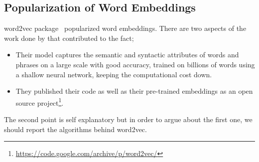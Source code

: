 

\subsection{Popularization of Word Embeddings}%
\label{sub:popularization_of_word_embeddings}

word2vec package~\cite{mikolov_efficient_2013,mikolov_distributed_2013,mikolov_linguistic_2013} popularized word embeddings.
There are two aspects of the work done by \citeauthor{mikolov_distributed_2013}  that contributed to the fact;
\begin{itemize}
    \item Their model captures the semantic and syntactic attributes of words and phrases on a large scale with good accuracy, trained on billions of words using a shallow neural network, keeping the computational cost down.
    \item They published their code as well as their pre-trained embeddings as an open source project\footnote{\url{https://code.google.com/archive/p/word2vec/}}.
\end{itemize}
The second point is self explanatory but in order to argue about the first one, we should report the algorithms behind word2vec.

